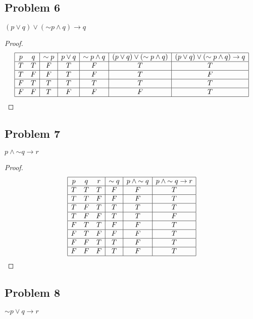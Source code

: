 \documentclass[14pt]{extarticle}
\begin{document}
\subsection{Problem 6}
$(p \vee q) \vee ({\sim p} \wedge q) \to q$

\begin{proof}
$$
\begin{array}{|cc|c|c|c|c|c|}
\hline
p & q & {\sim p} & p \vee q & {\sim p} \wedge q & (p \vee q) \vee ({\sim p} \wedge q) & (p \vee q) \vee ({\sim p} \wedge q) \to q \\
\hline
T & T & F & T & F & T & T \\
\hline
T & F & F & T & F & T & F \\
\hline
F & T & T & T & T & T & T \\
\hline
F & F & T & F & F & F & T \\
\hline
\end{array}
$$
\end{proof}

\subsection{Problem 7}
$p \wedge {\sim q} \to r$

\begin{proof}
$$
\begin{array}{|ccc|c|c|c|}
\hline
p & q & r & {\sim q} & p \wedge {\sim q} & p \wedge {\sim q} \to r \\
\hline
T & T & T & F & F & T \\
\hline
T & T & F & F & F & T \\
\hline
T & F & T & T & T & T \\
\hline
T & F & F & T & T & F \\
\hline
F & T & T & F & F & T \\
\hline
F & T & F & F & F & T \\
\hline
F & F & T & T & F & T \\
\hline
F & F & F & T & F & T \\
\hline
\end{array}
$$
\end{proof}

\subsection{Problem 8}
${\sim p} \vee q \to r$
\end{document}
